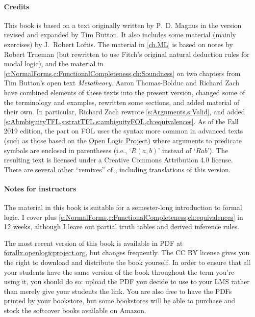 \paragraph{Credits} This book is based on a text originally written by P.~D. Magnus in the version revised and expanded by Tim Button. It also includes some material (mainly exercises) by J.~Robert Loftis. The material in \cref{ch.ML} is based on notes by Robert Trueman (but rewritten to use Fitch's original natural deduction rules for modal logic), and the material in \cref{c:NormalForms,c:FunctionalCompleteness,ch:Soundness} on two chapters from Tim Button's open text \textit{Metatheory}. Aaron Thomas-Bolduc and Richard Zach have combined elements of these texts into the present version, changed some of the terminology and examples, rewritten some sections, and added material of their own.  In particular, Richard Zach rewrote \cref{s:Arguments,s:Valid}, and added \cref{s:AbmbiguityTFL,s:stratTFL,s:ambiguityFOL,ch:equivalences}. As of the Fall 2019 edition, the part on FOL uses the syntax more common in advanced texts (such as those based on the \href{https://openlogicproject.org/}{Open Logic Project}) where arguments to predicate symbols are enclosed in parentheses (i.e., `$R(a,b)$' instead of `$Rab$'). The resulting text is licensed under a Creative Commons Attribution 4.0 license. There are \href{https://github.com/OpenLogicProject/OpenLogic/wiki/Other-Logic-Textbooks}{several other} ``remixes'' of \forallx, including translations of this version.

\paragraph{Notes for instructors} The material in this book is suitable for a semester-long introduction to formal logic. I cover  plus \cref{c:NormalForms,c:FunctionalCompleteness,ch:equivalences} in 12 weeks, although I leave out partial truth tables and derived inference rules.

The most recent version of this book is available in PDF at \href{https://forallx.openlogicproject.org}{forallx.openlogicproject.org}, but changes frequently.  The CC BY license gives you the right to download and distribute the book yourself. In order to ensure that all your students have the same version of the book throughout the term you're using it, you should do so: upload the PDF you decide to use to your LMS rather than merely give your students the link. You are also free to have the PDFs printed by your bookstore, but some bookstores will be able to purchase and stock the softcover books available on Amazon.

